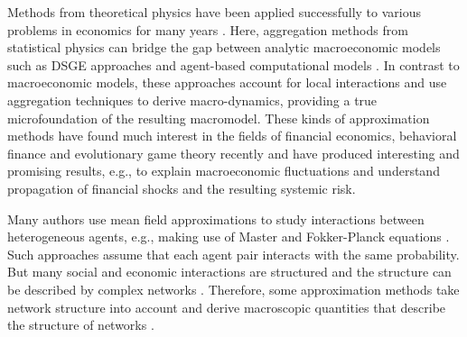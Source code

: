 Methods from theoretical physics have been applied successfully to various problems in economics for many years \citep{Mantegna1999}. Here, aggregation methods from statistical physics can bridge the gap between analytic macroeconomic models such as DSGE approaches and agent-based computational models \citep[for a review of physics methods in social modeling, see ref.][]{castellano2009statistical}. In contrast to macroeconomic models, these approaches account for local interactions and use aggregation techniques to derive macro-dynamics, providing a true microfoundation of the resulting macromodel.
These kinds of approximation methods have found much interest in the fields of financial economics, behavioral finance and evolutionary game theory recently and have produced interesting and promising results, e.g., to explain macroeconomic fluctuations and understand propagation of financial shocks and the resulting systemic risk.



Many authors use mean field approximations to study interactions between heterogeneous agents, e.g., making use of Master and Fokker-Planck equations \citep{Aoki1998, Aoki2007, DelliGatti2000, DiGuilmi2008, Chiarella2011a, Landini2014}. Such approaches assume that each agent pair interacts with the same probability.
But many social and economic interactions are structured and the structure can be described by complex networks \citep{Friedkin2011}. Therefore, some approximation methods take network structure into account and derive macroscopic quantities that describe the structure of networks \citep[e.g.][]{Alfarano2008a, Lux2016}.


